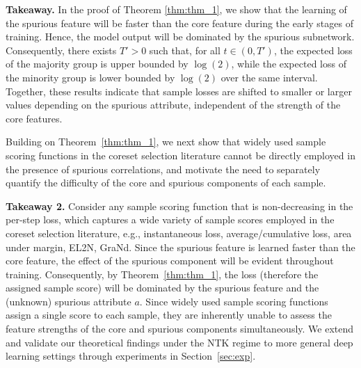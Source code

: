 \documentclass[letter,11pt]{article}
\begin{document}
\noindent \textbf{Takeaway.} In the proof of Theorem \ref{thm:thm_1}, we show that the learning of the spurious feature will be faster than the core feature during the early stages of training. Hence, the model output will be dominated by the spurious subnetwork. Consequently, there exists $T' > 0$ such that, for all $t \in (0, T')$, the expected loss of the majority group is upper bounded by $\log(2)$, while the expected loss of the minority group is lower bounded by $\log(2)$ over the same interval. Together, these results indicate that sample losses are shifted to smaller or larger values depending on the spurious attribute, independent of the strength of the core features.

Building on Theorem~\ref{thm:thm_1}, we next show that widely used sample scoring functions in the coreset selection literature cannot be directly employed in the presence of spurious correlations, and motivate the need to separately quantify the difficulty of the core and spurious components of each sample.

\noindent \textbf{Takeaway 2.} Consider any sample scoring function that is non-decreasing in the per-step loss, which captures a wide variety of sample scores employed in the coreset selection literature, e.g., instantaneous loss, average/cumulative loss, area under margin, EL2N, GraNd. Since the spurious feature is learned faster than the core feature, the effect of the spurious component will be evident throughout training. Consequently, by Theorem~\ref{thm:thm_1}, the loss (therefore the assigned sample score) will be dominated by the spurious feature and the (unknown) spurious attribute $a$. Since widely used sample scoring functions~\citep{EL2N, SelfSup, Memorization} assign a single score to each sample, they are inherently unable to assess the feature strengths of the core and spurious components simultaneously. We extend and validate our theoretical findings under the NTK regime to more general deep learning settings through experiments in Section~\ref{sec:exp}. 

\end{document}
